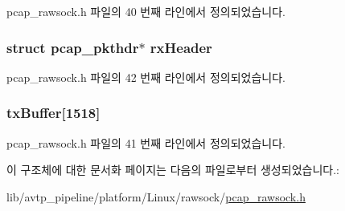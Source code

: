 pcap\+\_\+rawsock.\+h 파일의 40 번째 라인에서 정의되었습니다.

\subsubsection[{\texorpdfstring{rx\+Header}{rxHeader}}]{\setlength{\rightskip}{0pt plus 5cm}struct pcap\+\_\+pkthdr$\ast$ rx\+Header}\hypertarget{structpcap__rawsock__t_ae6451f27abf3b4dcac75da87d87d5a8c}{}\label{structpcap__rawsock__t_ae6451f27abf3b4dcac75da87d87d5a8c}


pcap\+\_\+rawsock.\+h 파일의 42 번째 라인에서 정의되었습니다.

\subsubsection[{\texorpdfstring{tx\+Buffer}{txBuffer}}]{ tx\+Buffer\mbox{[}1518\mbox{]}}\hypertarget{structpcap__rawsock__t_a7661fa3516bae1bdfe2000e2dea164ae}{}\label{structpcap__rawsock__t_a7661fa3516bae1bdfe2000e2dea164ae}


pcap\+\_\+rawsock.\+h 파일의 41 번째 라인에서 정의되었습니다.



이 구조체에 대한 문서화 페이지는 다음의 파일로부터 생성되었습니다.\+:\begin{DoxyCompactItemize}
\item 
lib/avtp\+\_\+pipeline/platform/\+Linux/rawsock/\hyperlink{pcap__rawsock_8h}{pcap\+\_\+rawsock.\+h}\end{DoxyCompactItemize}
